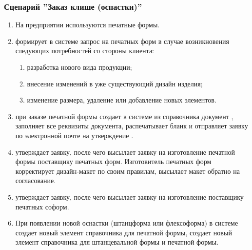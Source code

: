 \subsubsection{Сценарий ''Заказ клише (оснастки)''}
\label{bp:toolrequest_2}

\begin{enumerate}

\item На предприятии используются печатные формы.
\item \manager	 формирует в системе \gofro запрос на печатных форм в случае возникновения следующих потребностей со стороны клиента:
\begin{enumerate}
\item   	разработка нового вида продукции;
\item   	внесение изменений в уже существующий  дизайн изделия;
\item   	изменение размера, удаление или добавление новых элементов.
\end{enumerate}

\item \manager	при заказе печатной формы создает в системе \gofro из справочника  документ , \manager заполняет все реквизиты документа, распечатывает бланк и отправляет заявку по электронной почте на утверждение \director.


\item  \director утверждает заявку, после чего \manager высылает заявку на изготовление печатной формы поставщику печатных форм. Изготовитель печатных форм корректирует дизайн-макет по своим правилам, высылает макет обратно на согласование. 
\item \director утверждает заявку, после чего  \manager высылает заявку на изготовление  поставщику печатных соформ.
\item	При появлении новой оснастки (штанцформа или флексоформа)  в системе \gofro \tehnolog создает новый элемент справочника  для печатной формы, \tehnolog создает новый элемент справочника  для штанцевальной формы и печатной формы.

\end{enumerate}